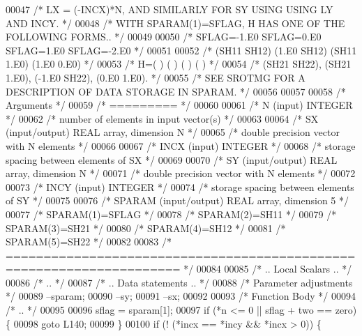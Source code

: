 \begin{DoxyCode}
00047 \textcolor{comment}{/*     LX = (-INCX)*N, AND SIMILARLY FOR SY USING USING LY AND INCY. */}
00048 \textcolor{comment}{/*     WITH SPARAM(1)=SFLAG, H HAS ONE OF THE FOLLOWING FORMS.. */}
00049 
00050 \textcolor{comment}{/*     SFLAG=-1.E0     SFLAG=0.E0        SFLAG=1.E0     SFLAG=-2.E0 */}
00051 
00052 \textcolor{comment}{/*       (SH11  SH12)    (1.E0  SH12)    (SH11  1.E0)    (1.E0  0.E0) */}
00053 \textcolor{comment}{/*     H=(          )    (          )    (          )    (          ) */}
00054 \textcolor{comment}{/*       (SH21  SH22),   (SH21  1.E0),   (-1.E0 SH22),   (0.E0  1.E0). */}
00055 \textcolor{comment}{/*     SEE  SROTMG FOR A DESCRIPTION OF DATA STORAGE IN SPARAM. */}
00056 
00057 
00058 \textcolor{comment}{/*  Arguments */}
00059 \textcolor{comment}{/*  ========= */}
00060 
00061 \textcolor{comment}{/*  N      (input) INTEGER */}
00062 \textcolor{comment}{/*         number of elements in input vector(s) */}
00063 
00064 \textcolor{comment}{/*  SX     (input/output) REAL array, dimension N */}
00065 \textcolor{comment}{/*         double precision vector with N elements */}
00066 
00067 \textcolor{comment}{/*  INCX   (input) INTEGER */}
00068 \textcolor{comment}{/*         storage spacing between elements of SX */}
00069 
00070 \textcolor{comment}{/*  SY     (input/output) REAL array, dimension N */}
00071 \textcolor{comment}{/*         double precision vector with N elements */}
00072 
00073 \textcolor{comment}{/*  INCY   (input) INTEGER */}
00074 \textcolor{comment}{/*         storage spacing between elements of SY */}
00075 
00076 \textcolor{comment}{/*  SPARAM (input/output)  REAL array, dimension 5 */}
00077 \textcolor{comment}{/*     SPARAM(1)=SFLAG */}
00078 \textcolor{comment}{/*     SPARAM(2)=SH11 */}
00079 \textcolor{comment}{/*     SPARAM(3)=SH21 */}
00080 \textcolor{comment}{/*     SPARAM(4)=SH12 */}
00081 \textcolor{comment}{/*     SPARAM(5)=SH22 */}
00082 
00083 \textcolor{comment}{/*  ===================================================================== */}
00084 
00085 \textcolor{comment}{/*     .. Local Scalars .. */}
00086 \textcolor{comment}{/*     .. */}
00087 \textcolor{comment}{/*     .. Data statements .. */}
00088     \textcolor{comment}{/* Parameter adjustments */}
00089     --sparam;
00090     --sy;
00091     --sx;
00092 
00093     \textcolor{comment}{/* Function Body */}
00094 \textcolor{comment}{/*     .. */}
00095 
00096     sflag = sparam[1];
00097     \textcolor{keywordflow}{if} (*n <= 0 || sflag + two == zero) \{
00098     \textcolor{keywordflow}{goto} L140;
00099     \}
00100     \textcolor{keywordflow}{if} (! (*incx == *incy && *incx > 0)) \{

\end{DoxyCode}
